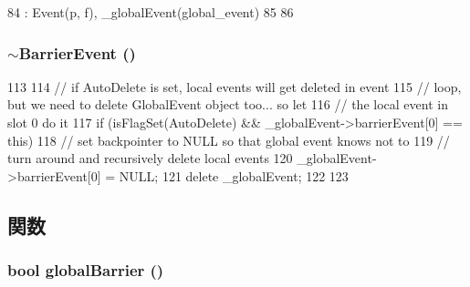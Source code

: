 \begin{DoxyCode}
84             : Event(p, f), _globalEvent(global_event)
85         {
86         }
\end{DoxyCode}
\hypertarget{classBaseGlobalEvent_1_1BarrierEvent_afe56c60259093b6c1ee131062e18789f}{
\subsubsection[{$\sim$BarrierEvent}]{\setlength{\rightskip}{0pt plus 5cm}$\sim${\bf BarrierEvent} ()}}
\label{classBaseGlobalEvent_1_1BarrierEvent_afe56c60259093b6c1ee131062e18789f}



\begin{DoxyCode}
113 {
114     // if AutoDelete is set, local events will get deleted in event
115     // loop, but we need to delete GlobalEvent object too... so let
116     // the local event in slot 0 do it
117     if (isFlagSet(AutoDelete) && _globalEvent->barrierEvent[0] == this) {
118         // set backpointer to NULL so that global event knows not to
119         // turn around and recursively delete local events
120         _globalEvent->barrierEvent[0] = NULL;
121         delete _globalEvent;
122     }
123 }
\end{DoxyCode}


\subsection{関数}
\hypertarget{classBaseGlobalEvent_1_1BarrierEvent_a32c5ab78a77d98e32aba77e992493b71}{
\subsubsection[{globalBarrier}]{\setlength{\rightskip}{0pt plus 5cm}bool globalBarrier ()}}
\label{classBaseGlobalEvent_1_1BarrierEvent_a32c5ab78a77d98e32aba77e992493b71}



